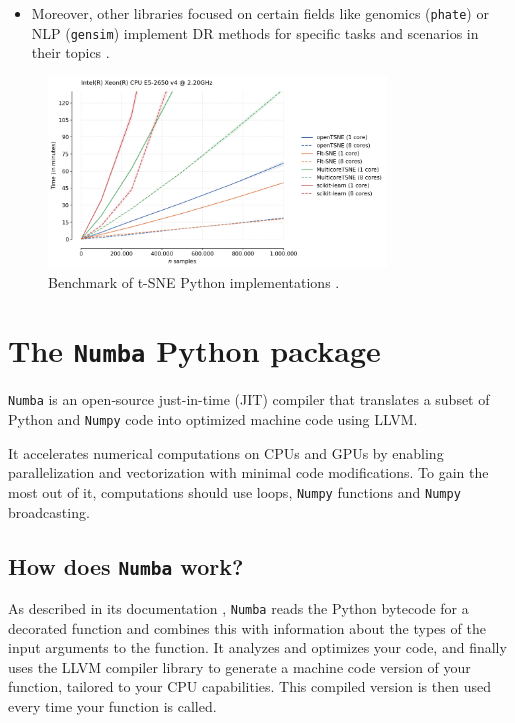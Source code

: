 \documentclass[a4paper,12pt]{article}
\begin{document}
\begin{itemize}
\begin{itemize}
    \end{itemize}
    \item Moreover, other libraries focused on certain fields like genomics (\texttt{phate}) or NLP (\texttt{gensim}) implement DR methods for specific tasks and scenarios in their topics \cite{phate, rehurek_lrec}.
\end{itemize}

\begin{figure}[ht]
    \centering
    \includegraphics[width=0.8\textwidth]{figures/python_tsne_benchmarks.png}
    \caption{Benchmark of t-SNE Python implementations \cite{Policar2024}.}
    \label{fig:python_tsne_benchmarks}
\end{figure}

\pagebreak
\section{The \texttt{Numba} Python package}
\label{sec:Numba}

\texttt{Numba} \cite{lam2015numba} is an open‐source just-in-time (JIT) compiler that translates a subset of Python and \texttt{Numpy} code into optimized machine code using LLVM.

It accelerates numerical computations on CPUs and GPUs by enabling parallelization and vectorization with minimal code modifications. To gain the most out of it, computations should use loops, \texttt{Numpy} functions and \texttt{Numpy} broadcasting.

\subsection{How does \texttt{Numba} work?}

As described in its documentation \cite{lam2015numba}, \texttt{Numba} reads the Python bytecode for a decorated function and combines this with information about the types of the input arguments to the function. It analyzes and optimizes your code, and finally uses the LLVM compiler library to generate a machine code version of your function, tailored to your CPU capabilities. This compiled version is then used every time your function is called.
\end{document}
